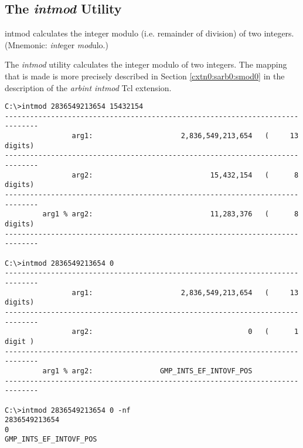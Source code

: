 \subsection{The \emph{intmod} Utility}
\label{cdcm0:sali0:smod0}

\begin{dosutilcommandname}{intmod}%
calculates the integer modulo (i.e. remainder of division) of 
two integers.
(Mnemonic:  \emph{int}eger
\emph{mod}ulo.)
\end{dosutilcommandname}

\begin{dosutilcommandsynopsis}
\end{dosutilcommandsynopsis}

\begin{dosutilcommanddescription}
The \emph{intmod} utility calculates the integer modulo
of two integers.  The mapping that is made is 
more precisely described in 
Section \ref{cxtn0:sarb0:smod0} in the
description of the \emph{arbint intmod} Tcl extension.
\end{dosutilcommanddescription}

\begin{dosutilcommandsampleinvocations}
\begin{scriptsize}
\begin{verbatim}
C:\>intmod 2836549213654 15432154
------------------------------------------------------------------------------
                arg1:                     2,836,549,213,654   (     13 digits)
------------------------------------------------------------------------------
                arg2:                            15,432,154   (      8 digits)
------------------------------------------------------------------------------
         arg1 % arg2:                            11,283,376   (      8 digits)
------------------------------------------------------------------------------

C:\>intmod 2836549213654 0
------------------------------------------------------------------------------
                arg1:                     2,836,549,213,654   (     13 digits)
------------------------------------------------------------------------------
                arg2:                                     0   (      1 digit )
------------------------------------------------------------------------------
         arg1 % arg2:                GMP_INTS_EF_INTOVF_POS
------------------------------------------------------------------------------

C:\>intmod 2836549213654 0 -nf
2836549213654
0
GMP_INTS_EF_INTOVF_POS
\end{verbatim}
\end{scriptsize}
\end{dosutilcommandsampleinvocations}

